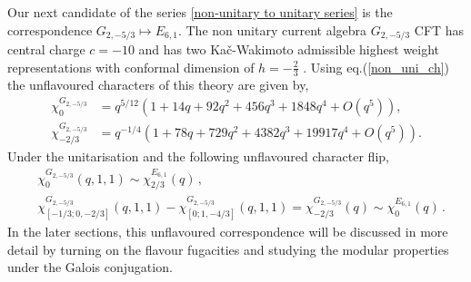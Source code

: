 \documentclass[a4paper,12pt]{article}
\begin{document}
Our next candidate of the series \eqref{non-unitary to unitary series} is the correspondence $G_{2,-5/3} \mapsto E_{6,1}$. The non unitary current algebra $G_{2,-5/3}$ CFT has central charge $c=-10$ and has two Ka\v c-Wakimoto admissible highest weight representations \cite{Kac:1988qc} with conformal dimension of $h=-\frac{2}{3}$ \cite{axtell2010vertex}. Using eq.(\ref{non_uni_ch}) the unflavoured characters of this theory are given by,
%
\begin{align}\label{g2-e6-unflavoured}
\chi^{G_{2,-5/3}}_0 & =  q^{5/12}\left(1+14 q+92 q^{2}+456 q^{3}+1848 q^{4}+\textit{O}(q^5)\right),\nonumber\\
\chi^{G_{2,-5/3}}_{-2/3} & =  {q^{-1/4}}\left(1+78 q+729 q^{2}+4382 q^{3}+19917 q^{4}+\textit{O}(q^5)\right).
\end{align}
%
Under the unitarisation and the following unflavoured character flip,
\begin{align}
   &\chi^{G_{2,-5/3}}_0(q,1,1)\sim\chi^{E_{6,1}}_{2/3}(q)\, , \\
    &\chi^{G_{2,-5/3}}_{[-1/3;0,-2/3]}(q,1,1)-\chi^{G_{2,-5/3}}_{[0;1,-4/3]}(q,1,1)=\chi^{G_{2,-5/3}}_{-2/3}(q)\sim\chi^{E_{6,1}}_{0}(q)\, .
\end{align}
In the later sections, this unflavoured correspondence will be discussed in more detail by turning on the flavour fugacities and studying the modular properties under the Galois conjugation.
\end{document}

